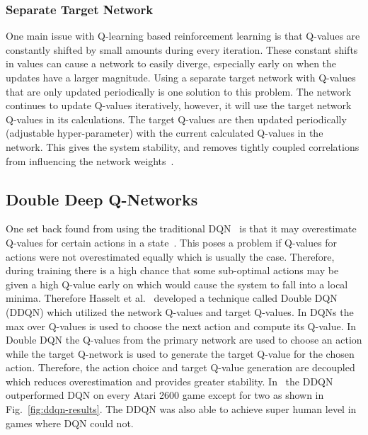 \documentclass[12pt,american]{report}
\begin{document}
\subsubsection{Separate Target Network}

One main issue with Q-learning based reinforcement learning is that Q-values are constantly shifted by small amounts during every iteration.  These constant shifts in values can cause a network to easily diverge, especially early on when the updates have a larger magnitude.  Using a separate target network with Q-values that are only updated periodically is one solution to this problem.  The network continues to update Q-values iteratively, however, it will use the target network Q-values in its calculations.  The target Q-values are then updated periodically (adjustable hyper-parameter) with the current calculated Q-values in the network.  This gives the system stability, and removes tightly coupled correlations from influencing the network weights~\cite{atari}.


\subsection{Double Deep Q-Networks}

One set back found from using the traditional DQN~\cite{atari} is that it may overestimate Q-values for certain actions in a state~\cite{van2016deep}. This poses a problem if Q-values for actions were not overestimated equally which is usually the case.  Therefore, during training there is a high chance that some sub-optimal actions may be given a high Q-value early on which would cause the system to fall into a local minima.  Therefore Hasselt et al.~\cite{van2016deep} developed a technique called Double DQN (DDQN) which utilized the network Q-values and target Q-values.  In DQNs the max over Q-values is used to choose the next action and compute its Q-value. In Double DQN the Q-values from the primary network are used to choose an action while the target Q-network is used to generate the target Q-value for the chosen action. Therefore, the action choice and target Q-value generation are decoupled which reduces overestimation and provides greater stability.  In~\cite{van2016deep} the DDQN outperformed DQN on every Atari 2600 game except for two as shown in Fig.~\ref{fig:ddqn-results}. The DDQN was also able to achieve super human level in games where DQN could not. 
\end{document}
